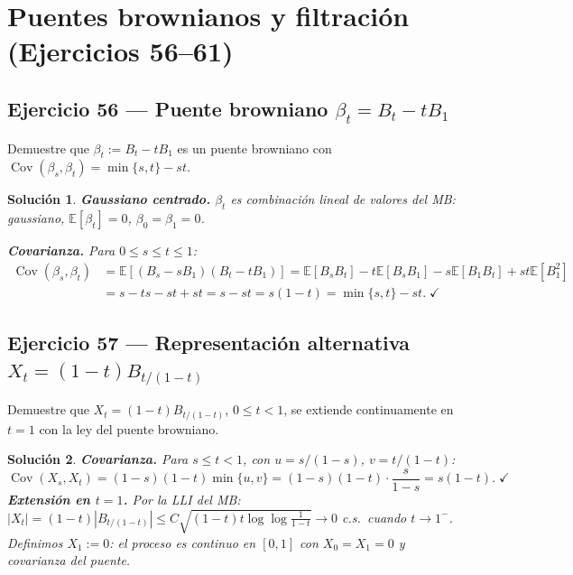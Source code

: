 \documentclass[12pt,letterpaper]{article}
\theoremstyle{ejercicio}
\theoremstyle{solucion}
\newtheorem*{solucion}{Solución}
\newcommand{\E}{\mathbb{E}}
\newcommand{\Cov}{\operatorname{Cov}}
\begin{document}
\newpage
\section{Puentes brownianos y filtración (Ejercicios 56--61)}

\subsection*{Ejercicio 56 — Puente browniano $\beta_t=B_t-tB_1$}

\begin{recuadro}
Demuestre que $\beta_t:=B_t-tB_1$ es un puente browniano con
$\Cov(\beta_s,\beta_t)=\min\{s,t\}-st$.
\end{recuadro}

\begin{solucion}
\textbf{Gaussiano centrado.} $\beta_t$ es combinación lineal de valores del MB:
gaussiano, $\E[\beta_t]=0$, $\beta_0=\beta_1=0$.

\textbf{Covarianza.} Para $0\le s\le t\le 1$:
\begin{align*}
  \Cov(\beta_s,\beta_t)
  &=\E[(B_s-sB_1)(B_t-tB_1)]
   =\E[B_sB_t]-t\E[B_sB_1]-s\E[B_1B_t]+st\E[B_1^2]\\
  &=s-ts-st+st=s-st=s(1-t)=\min\{s,t\}-st.\;\checkmark
\end{align*}
\end{solucion}

\subsection*{Ejercicio 57 — Representación alternativa $X_t=(1-t)B_{t/(1-t)}$}

\begin{recuadro}
Demuestre que $X_t=(1-t)B_{t/(1-t)}$, $0\le t<1$, se extiende continuamente en $t=1$
con la ley del puente browniano.
\end{recuadro}

\begin{solucion}
\textbf{Covarianza.} Para $s\le t<1$, con $u=s/(1-s)$, $v=t/(1-t)$:
\[
  \Cov(X_s,X_t)=(1-s)(1-t)\min\{u,v\}=(1-s)(1-t)\cdot\frac{s}{1-s}=s(1-t).\;\checkmark
\]
\textbf{Extensión en $t=1$.} Por la LLI del MB:
$|X_t|=(1-t)|B_{t/(1-t)}|\le C\sqrt{(1-t)t\log\log\frac{1}{1-t}}\to 0$ c.s.\ cuando $t\to 1^-$.
Definimos $X_1:=0$: el proceso es continuo en $[0,1]$ con $X_0=X_1=0$ y covarianza del puente.
\end{solucion}
\end{document}

